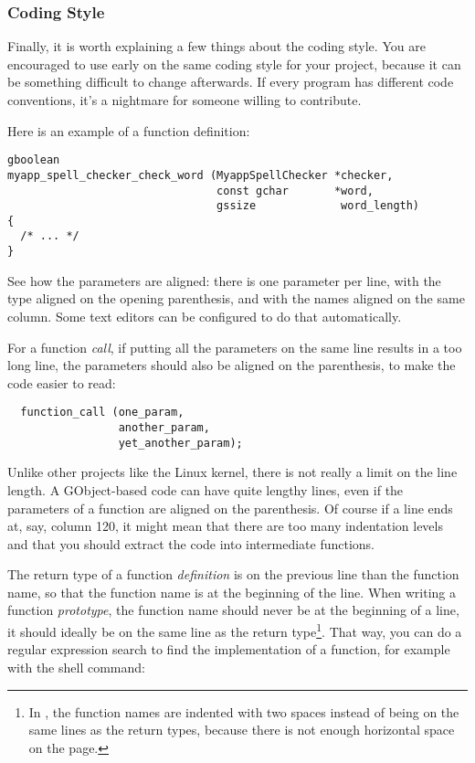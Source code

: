 \subsubsection{Coding Style}
Finally, it is worth explaining a few things about the coding style. You are encouraged to use early on the same coding style for your project, because it can be something difficult to change afterwards. If every program has different code conventions, it's a nightmare for someone willing to contribute.

Here is an example of a function definition:
\begin{lstlisting}
gboolean
myapp_spell_checker_check_word (MyappSpellChecker *checker,
                                const gchar       *word,
                                gssize             word_length)
{
  /* ... */
}
\end{lstlisting}

See how the parameters are aligned: there is one parameter per line, with the type aligned on the opening parenthesis, and with the names aligned on the same column. Some text editors can be configured to do that automatically.

For a function \emph{call}, if putting all the parameters on the same line results in a too long line, the parameters should also be aligned on the parenthesis, to make the code easier to read:
\begin{lstlisting}
  function_call (one_param,
                 another_param,
                 yet_another_param);
\end{lstlisting}

Unlike other projects like the Linux kernel, there is not really a limit on the line length. A GObject-based code can have quite lengthy lines, even if the parameters of a function are aligned on the parenthesis. Of course if a line ends at, say, column 120, it might mean that there are too many indentation levels and that you should extract the code into intermediate functions.

The return type of a function \emph{definition} is on the previous line than the function name, so that the function name is at the beginning of the line. When writing a function \emph{prototype}, the function name should never be at the beginning of a line, it should ideally be on the same line as the return type\footnote{In , the function names are indented with two spaces instead of being on the same lines as the return types, because there is not enough horizontal space on the page.}. That way, you can do a regular expression search to find the implementation of a function, for example with the  shell command:

